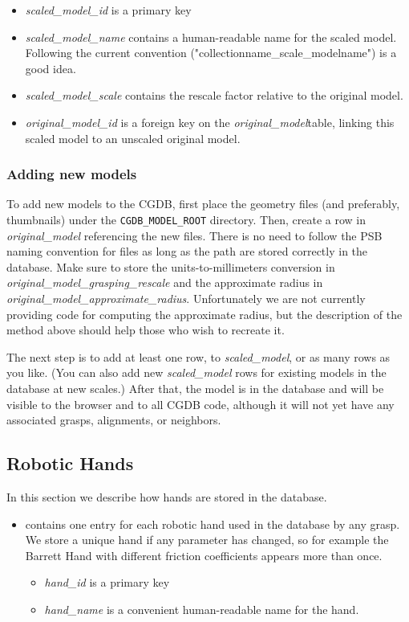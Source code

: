 \begin{itemize}
		\begin{itemize}
			\item \emph{scaled\_model\_id} is a primary key
			\item \emph{scaled\_model\_name} contains a human-readable
              name for the scaled model. Following the current
              convention ("collectionname\_scale\_modelname") is a
              good idea.
			\item \emph{scaled\_model\_scale} contains the rescale
              factor relative to the original model.
			\item\emph{original\_model\_id} is a foreign key on the
              \emph{original\_model}table, linking this scaled model
              to an unscaled original model.
		\end{itemize}
\end{itemize}


\subsubsection{Adding new models}
To add new models to the CGDB, first place the geometry files (and
preferably, thumbnails) under the \texttt{CGDB\_MODEL\_ROOT}
directory. Then, create a row in \emph{original\_model} referencing
the new files. There is no need to follow the PSB naming convention
for files as long as the path are stored correctly in the
database. Make sure to store the units-to-millimeters conversion in
\emph{original\_model\_grasping\_rescale} and the approximate radius
in \emph{original\_model\_approximate\_radius}. Unfortunately we are
not currently providing code for computing the approximate radius, but
the description of the method above should help those who wish to
recreate it.

The next step is to add at least one row, to \emph{scaled\_model}, or
as many rows as you like. (You can also add new \emph{scaled\_model}
rows for existing models in the database at new scales.) After that,
the model is in the database and will be visible to the browser and to
all CGDB code, although it will not yet have any associated grasps,
alignments, or neighbors.


\subsection{Robotic Hands}
In this section we describe how hands are stored in the database.

\begin{itemize}
	\item {} contains one entry for each robotic hand used
      in the database by any grasp. We store a unique hand if any
      parameter has changed, so for example the Barrett Hand with
      different friction coefficients appears more than once.
		\begin{itemize}
			\item \emph{hand\_id} is a primary key
			\item \emph{hand\_name} is a convenient human-readable
              name for the hand.
		\end{itemize}
\end{itemize}


